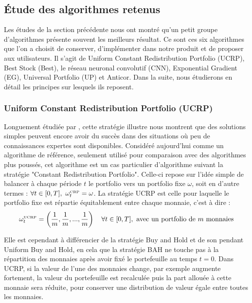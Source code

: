 \documentclass[a4paper, 10pt]{article}
\begin{document}
\subsection{Étude des algorithmes retenus}
\label{sec:theorie_etude}

Les études de la section précédente nous ont montré qu'un petit groupe d'algorithmes présente souvent les meilleurs résultat. Ce sont ces six algorithmes que l'on a choisit de conserver, d'implémenter dans notre produit et de proposer aux utilisateurs. Il s'agit de Uniform Constant Redistribution Portfolio (UCRP), Best Stock (Best), le réseau neuronal convolutif (CNN), Exponential Gradient (EG), Universal Portfolio (UP) et Anticor. Dans la suite, nous étudierons en détail les principes sur lesquels ils reposent.

\subsubsection{Uniform Constant Redistribution Portfolio (UCRP)}
\label{sec:theorie_ucrp}

Longuement étudiée par \citet{Cover1991}, cette stratégie illustre nous montrent que des solutions simples peuvent encore avoir du succès dans des situations où peu de connaissances expertes sont disponibles. Considéré aujourd'hui comme un algorithme de référence, seulement utilisé pour comparaison avec des algorithmes plus poussés, cet algorithme est un cas particulier d’algorithme suivant la stratégie "Constant Redistribution Portfolio". Celle-ci repose sur l'idée simple de balancer à chaque période $t$ le portfolio vers un portfolio fixe $\omega$, soit en d'autre termes : $\forall t \in [0, T],\ \omega_t^{\text{\tiny CRP}} = \omega$. La stratégie UCRP est celle pour laquelle le portfolio fixe est répartie équitablement entre chaque monnaie, c'est à dire :
\begin{equation}
    \omega_t^{\text{\tiny UCRP}} = \left(\frac{1}{m}, \frac{1}{m}, ..., \frac{1}{m} \right) \quad \forall t \in [0, T], \text{ avec un portfolio de $m$ monnaies} 
\end{equation}

Elle est cependant à différencier de la stratégie Buy and Hold et de son pendant Uniform Buy and Hold, en cela que la stratégie BAH ne touche pas à la répartition des monnaies après avoir fixé le portefeuille au temps $t=0$. Dans UCRP, si la valeur de l'une des monnaies change, par exemple augmente fortement, la valeur du portefeuille est recalculée puis la part allouée à cette monnaie sera réduite, pour conserver une distribution de valeur égale entre toutes les monnaies.
\end{document}
